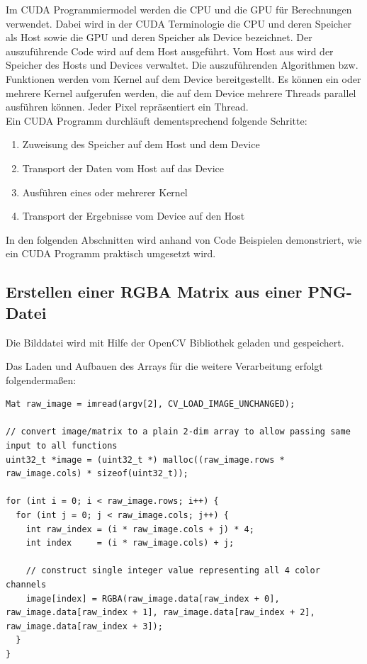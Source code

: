 \documentclass{llncs}
\begin{document}
Im CUDA Programmiermodel werden die CPU und die GPU für Berechnungen verwendet. Dabei wird in der CUDA Terminologie die CPU und deren Speicher als Host sowie die GPU und deren Speicher als Device bezeichnet. Der auszuführende Code wird auf dem Host ausgeführt. Vom Host aus wird der Speicher des Hosts und Devices verwaltet. Die auszuführenden Algorithmen bzw. Funktionen werden vom Kernel auf dem Device bereitgestellt. Es können ein oder mehrere Kernel aufgerufen werden, die auf dem Device mehrere Threads parallel ausführen können. Jeder Pixel repräsentiert ein Thread.\\
\newpage
Ein CUDA Programm durchläuft dementsprechend folgende Schritte:
\begin{enumerate}
	\item Zuweisung des Speicher auf dem Host und dem Device
	\item Transport der Daten vom Host auf das Device
	\item Ausführen eines oder mehrerer Kernel
	\item Transport der Ergebnisse vom Device auf den Host
\end{enumerate}

In den folgenden Abschnitten wird anhand von Code Beispielen demonstriert, wie ein CUDA Programm praktisch umgesetzt wird.\\

%
\subsection{Erstellen einer RGBA Matrix aus einer PNG-Datei}
%
Die Bilddatei wird mit Hilfe der OpenCV Bibliothek geladen und gespeichert.

Das Laden und Aufbauen des Arrays für die weitere Verarbeitung erfolgt folgendermaßen:

\begin{lstlisting}
Mat raw_image = imread(argv[2], CV_LOAD_IMAGE_UNCHANGED);

// convert image/matrix to a plain 2-dim array to allow passing same input to all functions
uint32_t *image = (uint32_t *) malloc((raw_image.rows * raw_image.cols) * sizeof(uint32_t));

for (int i = 0; i < raw_image.rows; i++) {
  for (int j = 0; j < raw_image.cols; j++) {
    int raw_index = (i * raw_image.cols + j) * 4;
    int index     = (i * raw_image.cols) + j;

    // construct single integer value representing all 4 color channels
    image[index] = RGBA(raw_image.data[raw_index + 0], raw_image.data[raw_index + 1], raw_image.data[raw_index + 2], raw_image.data[raw_index + 3]);
  }
}
\end{lstlisting}
\newpage
%
\end{document}
